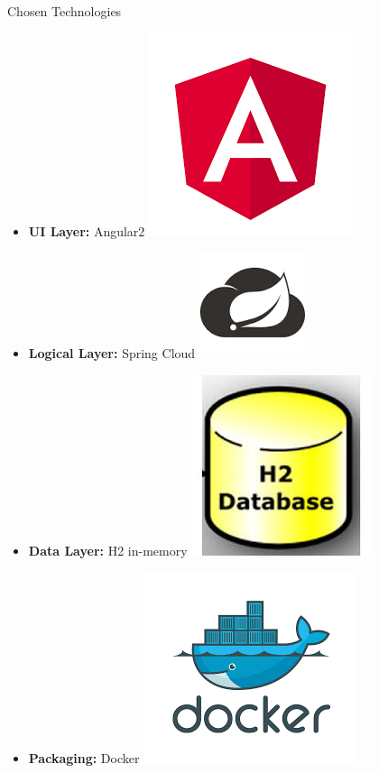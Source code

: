 \documentclass{beamer}
\begin{document}
\begin{frame}{Chosen Technologies}
	\begin{itemize}[<+->]
		\item \textbf{UI Layer:} Angular2 \includegraphics[scale=.07]{angular2_logo}
		\item \textbf{Logical Layer:} Spring Cloud \includegraphics[scale=.09]{spring_cloud_logo}
		\item \textbf{Data Layer:} H2 in-memory \includegraphics[scale=.07]{h2_logo}
		\item \textbf{Packaging:} Docker \includegraphics[scale=.09]{docker_logo}

\end{itemize}
\end{frame}
\end{document}
